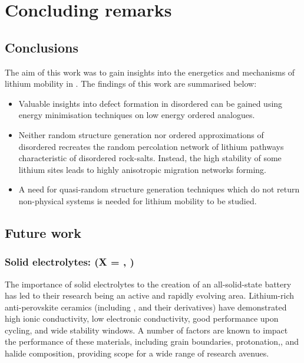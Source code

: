 \chapter{Concluding remarks}

\section{Conclusions}
The aim of this work was to gain insights into the energetics and mechanisms of lithium mobility in .
The findings of this work are summarised below:

\begin{itemize}
	\item Valuable insights into defect formation in disordered  can be gained using energy minimisation techniques on low energy ordered analogues.
	\item Neither random structure generation nor ordered approximations of disordered  recreates the random percolation network of lithium pathways characteristic of disordered rock-salts.
	Instead, the high stability of some lithium sites leads to highly anisotropic migration networks forming.
	\item A need for quasi-random structure generation techniques which do not return non-physical systems is needed for  lithium mobility to be studied.
\end{itemize}
\section{Future work}

\subsection{Solid electrolytes:  (X = , )}
The importance of solid electrolytes to the creation of an all-solid-state battery has led to their research being an active and rapidly evolving area.
Lithium-rich anti-perovskite ceramics (including ,  and their derivatives)\cite{Zhao2012} have demonstrated high ionic conductivity, low electronic conductivity, good performance upon cycling, and wide stability windows.
A number of factors are known to impact the performance of these materials, including grain boundaries,\cite{Dawson2018} protonation,\cite{Dawson2018a}, and halide composition,\cite{Dawson2018b} providing scope for a wide range of research avenues.


